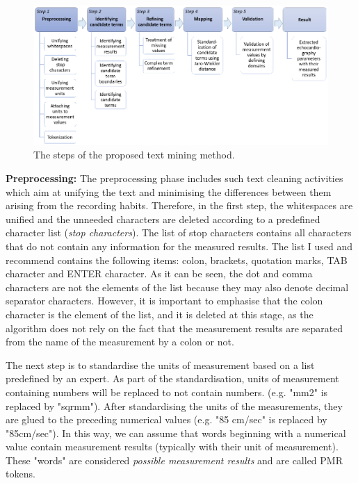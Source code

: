\begin{figure}[h]
	\centering
        \captionsetup{justification=centering}
	\includegraphics[width=\textwidth]{assets/figures/text_mining/extraction/workflow.eps}
	\caption{The steps of the proposed text mining method.}
	\label{fig:extraction_workflow} 
\end{figure}

\textbf{Preprocessing:} The preprocessing phase includes such text cleaning activities which aim at unifying the text and minimising the differences between them arising from the recording habits. Therefore, in the first step, the whitespaces are unified and the unneeded characters are deleted according to a predefined character list (\textit{stop characters}). The list of stop characters contains all characters that do not contain any information for the measured results. The list I used and recommend contains the following items: colon, brackets, quotation marks, TAB character and ENTER character. As it can be seen, the dot and comma characters are not the elements of the list because they may also denote decimal separator characters. However, it is important to emphasise that the colon character is the element of the list, and it is deleted at this stage, as the algorithm does not rely on the fact that the measurement results are separated from the name of the measurement by a colon or not. 

The next step is to standardise the units of measurement based on a list predefined by an expert. As part of the standardisation, units of measurement containing numbers will be replaced to not contain numbers. (e.g. "mm2" is replaced by "sqrmm"). After standardising the units of the measurements, they are glued to the preceding numerical values (e.g. "85 cm/sec" is replaced by "85cm/sec"). In this way, we can assume that words beginning with a numerical value contain measurement results (typically with their unit of measurement). These "words" are considered \textit{possible measurement results} and are called PMR tokens.

